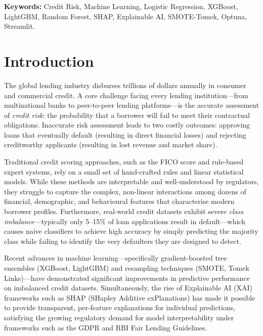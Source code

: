 \documentclass[12pt,a4paper]{report}
\begin{document}
\vspace{0.5cm}
\noindent\textbf{Keywords:} Credit Risk, Machine Learning, Logistic Regression, XGBoost, LightGBM, Random Forest, SHAP, Explainable AI, SMOTE-Tomek, Optuna, Streamlit.

\newpage
\tableofcontents
\newpage
\listoffigures
\listoftables
\newpage


\chapter{Introduction}

The global lending industry disburses trillions of dollars annually in consumer and commercial credit. A core challenge facing every lending institution---from multinational banks to peer-to-peer lending platforms---is the accurate assessment of \emph{credit risk}: the probability that a borrower will fail to meet their contractual obligations. Inaccurate risk assessment leads to two costly outcomes: approving loans that eventually default (resulting in direct financial losses) and rejecting creditworthy applicants (resulting in lost revenue and market share).

Traditional credit scoring approaches, such as the FICO score and rule-based expert systems, rely on a small set of hand-crafted rules and linear statistical models. While these methods are interpretable and well-understood by regulators, they struggle to capture the complex, non-linear interactions among dozens of financial, demographic, and behavioural features that characterise modern borrower profiles. Furthermore, real-world credit datasets exhibit severe \emph{class imbalance}---typically only 5--15\% of loan applications result in default---which causes naive classifiers to achieve high accuracy by simply predicting the majority class while failing to identify the very defaulters they are designed to detect.

Recent advances in machine learning---specifically gradient-boosted tree ensembles (XGBoost, LightGBM) and resampling techniques (SMOTE, Tomek Links)---have demonstrated significant improvements in predictive performance on imbalanced credit datasets. Simultaneously, the rise of Explainable AI (XAI) frameworks such as SHAP (SHapley Additive exPlanations) has made it possible to provide transparent, per-feature explanations for individual predictions, satisfying the growing regulatory demand for model interpretability under frameworks such as the GDPR and RBI Fair Lending Guidelines.
\end{document}
